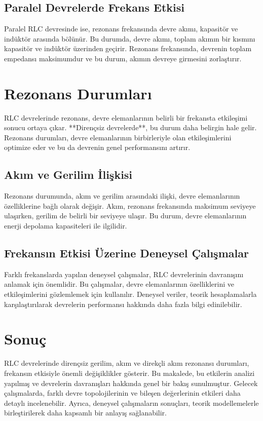 \documentclass[11pt,letterpaper,twocolumn]{article}
\begin{document}
\subsection{Paralel Devrelerde Frekans Etkisi}
Paralel RLC devresinde ise, rezonans frekansında devre akımı, kapasitör ve indüktör arasında bölünür. Bu durumda, devre akımı, toplam akımın bir kısmını kapasitör ve indüktör üzerinden geçirir. Rezonans frekansında, devrenin toplam empedansı maksimumdur ve bu durum, akımın devreye girmesini zorlaştırır.

\section{Rezonans Durumları}
RLC devrelerinde rezonans, devre elemanlarının belirli bir frekansta etkileşimi sonucu ortaya çıkar. **Dirençsiz devrelerde**, bu durum daha belirgin hale gelir. Rezonans durumları, devre elemanlarının birbirleriyle olan etkileşimlerini optimize eder ve bu da devrenin genel performansını artırır.

\subsection{Akım ve Gerilim İlişkisi}
Rezonans durumunda, akım ve gerilim arasındaki ilişki, devre elemanlarının özelliklerine bağlı olarak değişir. Akım, rezonans frekansında maksimum seviyeye ulaşırken, gerilim de belirli bir seviyeye ulaşır. Bu durum, devre elemanlarının enerji depolama kapasiteleri ile ilgilidir.

\subsection{Frekansın Etkisi Üzerine Deneysel Çalışmalar}
Farklı frekanslarda yapılan deneysel çalışmalar, RLC devrelerinin davranışını anlamak için önemlidir. Bu çalışmalar, devre elemanlarının özelliklerini ve etkileşimlerini gözlemlemek için kullanılır. Deneysel veriler, teorik hesaplamalarla karşılaştırılarak devrelerin performansı hakkında daha fazla bilgi edinilebilir.

\section{Sonuç}
RLC devrelerinde dirençsiz gerilim, akım ve direkçli akım rezonansı durumları, frekansın etkisiyle önemli değişiklikler gösterir. Bu makalede, bu etkilerin analizi yapılmış ve devrelerin davranışları hakkında genel bir bakış sunulmuştur. Gelecek çalışmalarda, farklı devre topolojilerinin ve bileşen değerlerinin etkileri daha detaylı incelenebilir. Ayrıca, deneysel çalışmaların sonuçları, teorik modellemelerle birleştirilerek daha kapsamlı bir anlayış sağlanabilir.
\end{document}
